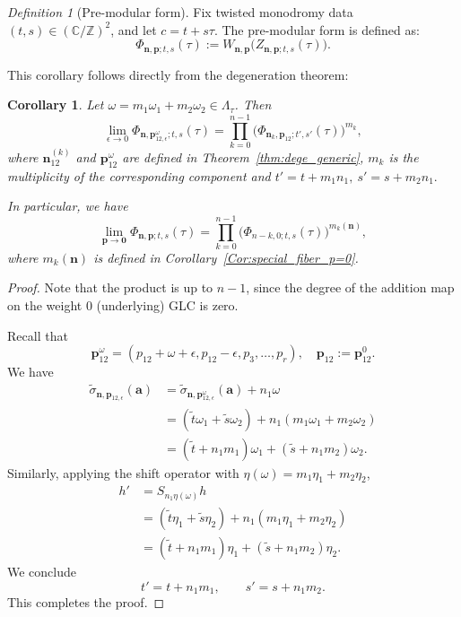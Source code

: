 \documentclass[11pt]{amsart}
\newtheorem{corollary}[theorem]{Corollary}
\theoremstyle{remark}
\newtheorem{definition}[theorem]{Definition}
\numberwithin{equation}{section}
\begin{document}
\begin{definition}[Pre-modular form] 
Fix twisted monodromy data $(t,s) \in (\mathbb{C}/\mathbb{Z})^2$, and let $c = t + s\tau$. The pre-modular form is defined as:
\[
    \Phi_{\mathbf{n},\mathbf{p}; t, s}(\tau) := W_{\mathbf{n},\mathbf{p}} \Big( Z_{\mathbf{n},\mathbf{p};t,s}(\tau) \Big).
\]
\end{definition}
This corollary follows directly from the degeneration theorem:
\begin{corollary}\label{cor:modular_decomp} 
Let $\omega = m_1\omega_1 + m_2 \omega_2 \in \Lambda_\tau$. Then
\[
    \lim_{\epsilon \rightarrow 0} \Phi_{\mathbf{n},\mathbf{p}_{12, \epsilon}^\omega;t,s}(\tau) = \prod_{k=0}^{n-1} \Big( \Phi_{\mathbf{n}_k,\mathbf{p}_{12};t',s'}(\tau) \Big)^{m_k},
\]
where $\mathbf{n}_{12}^{(k)}$ and $\mathbf{p}_{12}^{\omega}$ are defined in Theorem~\ref{thm:dege_generic}, $m_k$ is the multiplicity of the corresponding component and
$t' = t + m_1 n_1, \ s'= s + m_2 n_1.$

In particular, we have
\[
    \lim_{\mathbf{p} \rightarrow \mathbf{0}} \Phi_{\mathbf{n},\mathbf{p};t,s}(\tau) = \prod_{k=0}^{n-1} \Big( \Phi_{n-k,0;t,s}(\tau) \Big)^{m_k(\mathbf{n})},
\]
where $m_k(\mathbf{n})$ is defined in Corollary~\ref{Cor:special_fiber_p=0}.
\end{corollary}
\begin{proof}
Note that the product is up to $n-1$, since the degree of the addition map on the weight 0 (underlying) GLC is zero.

Recall that
\[
    \mathbf{p}_{12}^\omega = (p_{12} + \omega +\epsilon, p_{12}-\epsilon,p_3,\dots,p_r), \quad \mathbf{p}_{12} := \mathbf{p}_{12}^0.
\]
We have
\[
\begin{split}
    \widetilde{\sigma}_{\mathbf{n},\mathbf{p}_{12, \epsilon}}(\mathbf{a}) &= \widetilde{\sigma}_{\mathbf{n},\mathbf{p}_{12, \epsilon}^\omega}(\mathbf{a}) + n_1 \omega \\
    &= (\tilde{t} \omega_1 + \tilde{s} \omega_2) + n_1 (m_1 \omega_1 + m_2 \omega_2) \\
    &= (\tilde{t} + n_1 m_1) \omega_1 + (\tilde{s} + n_1 m_2) \omega_2.
\end{split}
\]
Similarly, applying the shift operator with $\eta(\omega) = m_1 \eta_1 + m_2 \eta_2$,
\[
\begin{split}
    h' &= S_{n_1 \eta(\omega)} h \\
    &= (\tilde{t} \eta_1 + \tilde{s} \eta_2) + n_1(m_1 \eta_1 + m_2 \eta_2) \\
    &= (\tilde{t} + n_1 m_1) \eta_1 + (\tilde{s} + n_1 m_2) \eta_2.
\end{split}
\]
We conclude
\[
    t' = t + n_1 m_1, \qquad
    s' = s + n_1 m_2.
\]
This completes the proof.
\end{proof}
\end{document}
